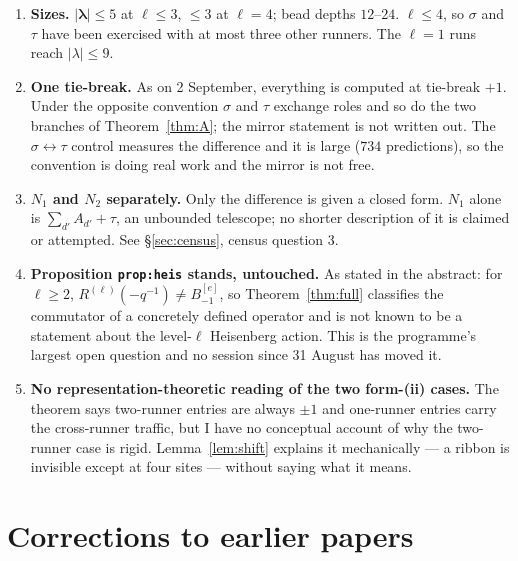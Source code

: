 \documentclass[11pt]{article}
\theoremstyle{definition}
\theoremstyle{remark}
\newcommand{\bl}{\boldsymbol{\lambda}}
\begin{document}
\begin{enumerate}
\item \textbf{Sizes.} $|\bl|\le5$ at $\ell\le3$, $\le3$ at $\ell=4$; bead depths
$12$--$24$. $\ell\le4$, so $\sigma$ and $\tau$ have been exercised with at most three
other runners. The $\ell=1$ runs reach $|\lambda|\le9$.

\item \textbf{One tie-break.} As on 2 September, everything is computed at tie-break
$+1$. Under the opposite convention $\sigma$ and $\tau$ exchange roles and so do the two
branches of Theorem~\ref{thm:A}; the mirror statement is not written out. The
$\sigma\leftrightarrow\tau$ control measures the difference and it is large ($734$
predictions), so the convention is doing real work and the mirror is not free.

\item \textbf{$N_1$ and $N_2$ separately.} Only the difference is given a closed form.
$N_1$ alone is $\sum_{d'}A_{d'}+\tau$, an unbounded telescope; no shorter description of
it is claimed or attempted. See \S\ref{sec:census}, census question 3.

\item \textbf{Proposition \texttt{prop:heis} stands, untouched.} As stated in the
abstract: for $\ell\ge2$, $R^{(\ell)}(-q^{-1})\ne B^{[e]}_{-1}$, so
Theorem~\ref{thm:full} classifies the commutator of a concretely defined operator and is
not known to be a statement about the level-$\ell$ Heisenberg action. This is the
programme's largest open question and no session since 31 August has moved it.

\item \textbf{No representation-theoretic reading of the two form-(ii) cases.} The
theorem says two-runner entries are always $\pm1$ and one-runner entries carry the
cross-runner traffic, but I have no conceptual account of why the two-runner case is
rigid. Lemma~\ref{lem:shift} explains it mechanically --- a ribbon is invisible except at
four sites --- without saying what it means.
\end{enumerate}

\section{Corrections to earlier papers}\label{sec:corr}
\end{document}
